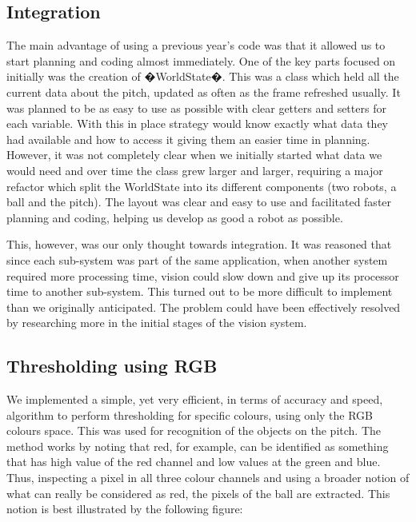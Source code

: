 \subsection{Integration}

The main advantage of using a previous year's code was that it allowed us to start planning and coding almost immediately. One of the key parts focused on initially was the creation of �WorldState�. This was a class which held all the current data about the pitch, updated as often as the frame refreshed usually. It was planned to be as easy to use as possible with clear getters and setters for each variable. With this in place strategy would know exactly what data they had available and how to access it giving them an easier time in planning. However, it was not completely clear when we initially started what data we would need and over time the class grew larger and larger, requiring a major refactor which split the WorldState into its different components (two robots, a ball and the pitch). The layout was clear and easy to use and facilitated faster planning and coding, helping us develop as good a robot as possible.

This, however, was our only thought towards integration. It was reasoned that since each sub-system was part of the same application, when another system required more processing time, vision could slow down and give up its processor time to another sub-system. This turned out to be more difficult to implement than we originally anticipated. The problem could have been effectively resolved by researching more in the initial stages of the vision system.

\subsection{Thresholding using RGB}
\label{sec:thresh}

We implemented a simple, yet very efficient, in terms of accuracy and speed, algorithm to perform thresholding for specific colours, using only the RGB colours space. This was used for recognition of the objects on the pitch. The method works by noting that red, for example, can be identified as something that has high value of the red channel and low values at the green and blue.  Thus, inspecting a pixel in all three colour channels and using a broader notion of what can really be considered as red, the pixels of the ball are extracted. This notion is best illustrated by the following figure: 


